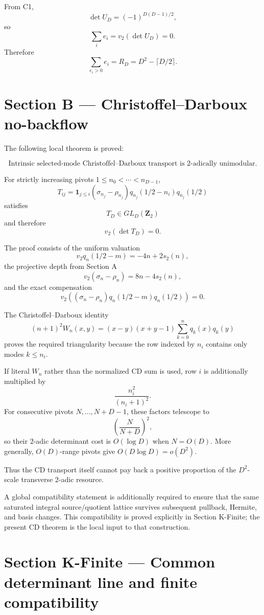\documentclass[
  10pt,
  letterpaper,
]{article}
\theoremstyle{definition}
\theoremstyle{remark}
\begin{document}
From C1, \[
\det U_D=(-1)^{D(D-1)/2},
\] so \[
\sum_i e_i=v_2(\det U_D)=0.
\] Therefore \[
\boxed{
\sum_{e_i>0}e_i=R_D=D^2-\lceil D/2\rceil.
}
\]

\section{Section B --- Christoffel--Darboux
no-backflow}\label{section-b-christoffeldarboux-no-backflow}

The following local theorem is proved:

\[
\boxed{
\text{Intrinsic selected-mode Christoffel–Darboux transport is }
2\text{-adically unimodular}.
}
\]

For strictly increasing pivots \(1\le n_0<\cdots<n_{D-1}\), \[
T_{ij}
=
\mathbf1_{j\le i}
(\sigma_{n_j}-\rho_{n_j})
q_{n_j}(1/2-n_i)q_{n_j}(1/2)
\] satisfies \[
\boxed{T_D\in GL_D(\mathbf Z_2)}
\] and therefore \[
\boxed{v_2(\det T_D)=0.}
\]

The proof consists of the uniform valuation \[
v_2q_n(1/2-m)=-4n+2s_2(n),
\] the projective depth from Section A \[
v_2(\sigma_n-\rho_n)=8n-4s_2(n),
\] and the exact compensation \[
v_2\!\left(
(\sigma_n-\rho_n)
q_n(1/2-m)q_n(1/2)
\right)=0.
\]

The Christoffel--Darboux identity \[
(n+1)^2W_n(x,y)
=
(x-y)(x+y-1)
\sum_{k=0}^nq_k(x)q_k(y)
\] proves the required triangularity because the row indexed by \(n_i\)
contains only modes \(k\le n_i\).

If literal \(W_n\) rather than the normalized CD sum is used, row \(i\)
is additionally multiplied by \[
\frac{n_i^2}{(n_i+1)^2}.
\] For consecutive pivots \(N,\ldots,N+D-1\), these factors telescope to
\[
\left(\frac{N}{N+D}\right)^2,
\] so their \(2\)-adic determinant cost is \(O(\log D)\) when
\(N=O(D)\). More generally, \(O(D)\)-range pivots give
\(O(D\log D)=o(D^2)\).

Thus the CD transport itself cannot pay back a positive proportion of
the \(D^2\)-scale transverse \(2\)-adic resource.

A global compatibility statement is additionally required to ensure that
the same saturated integral source/quotient lattice survives subsequent
pullback, Hermite, and basis changes. This compatibility is proved
explicitly in Section K-Finite; the present CD theorem is the local
input to that construction.

\section{Section K-Finite --- Common determinant line and finite
compatibility}\label{section-k-finite-common-determinant-line-and-finite-compatibility}
\end{document}
